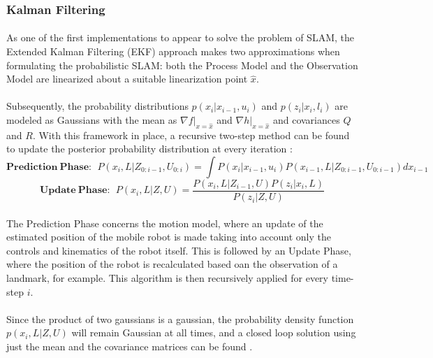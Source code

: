 \documentclass[11pt]{article}
\begin{document}
	\subsubsection{Kalman Filtering}
	\paragraph{}
	As one of the first implementations to appear to solve the problem of SLAM, the Extended Kalman Filtering (EKF) approach makes two approximations when formulating the probabilistic SLAM: both the Process Model and the Observation Model are linearized about a suitable linearization point $\hat{x}$.

	\paragraph{}
	 Subsequently, the probability distributions $p(x_i|x_{i-1}, u_i)$ and $p(z_i|x_i, l_i)$ are modeled as Gaussians with the mean as $\nabla f|_{x=\hat{x}}$ and $\nabla h|_{x=\hat{x}}$ and covariances $Q$ and $R$. With this framework in place, a recursive two-step method can be found to update the posterior probability distribution at every iteration \cite{SLAMPartI}:
		\begin{equation*}
		\mathbf{Prediction\ Phase:}\ \ 
		P(x_{i},L|Z_{0:i-1}, U_{0:i}) = \int P(x_i | x_{i-1}, u_{i}) P(x_{i-1}, L |Z_{0:i-1}, U_{0:i-1})dx_{i-1}
		\end{equation*}
		\begin{equation*}
		\mathbf{Update\ Phase:} \ \  P(x_i, L | Z, U) = \frac{P(x_{i}, L | Z_{i-1}, U)P(z_i|x_i,L)}{P(z_i|Z, U)}
		\end{equation*}	 	
	\paragraph{}
	The Prediction Phase concerns the motion model, where an update of the estimated position of the mobile robot is made taking into account only the controls and kinematics of the robot itself. This is followed by an Update Phase, where the position of the robot is recalculated based oan the observation of a landmark, for example. This algorithm is then recursively applied for every time-step $i$. 	
	\paragraph{}	 
	 Since the product of two gaussians is a gaussian, the probability density function $p(x_i, L|Z, U)$ will remain Gaussian at all times, and a closed loop solution using just the mean and the covariance matrices can be found \cite{772544}.
\end{document}
